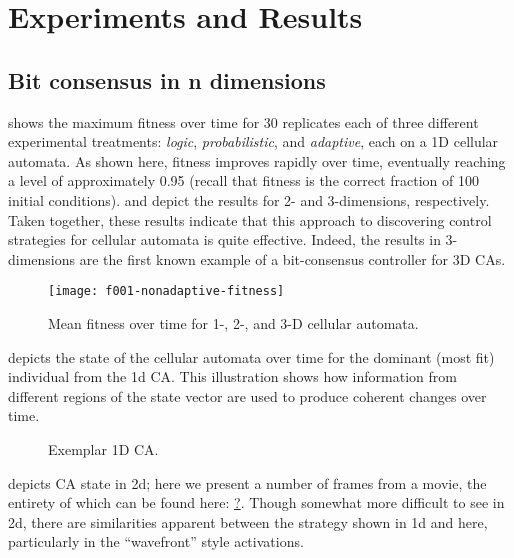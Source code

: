 \section{Experiments and Results}\label{s:results}


\subsection{Bit consensus in n dimensions}

 shows the maximum fitness over time for 30 replicates each of three different experimental treatments: {\em logic}, {\em probabilistic}, and {\em adaptive}, each on a 1D cellular automata.  As shown here, fitness improves rapidly over time, eventually reaching a level of approximately 0.95 (recall that fitness is the correct fraction of 100 initial conditions).   and  depict the results for 2- and 3-dimensions, respectively.  Taken together, these results indicate that this approach to discovering control strategies for cellular automata is quite effective.  Indeed, the results in 3-dimensions are the first known example of a bit-consensus controller for 3D CAs.

\begin{figure}
\centering\texttt{[image: f001-nonadaptive-fitness]}
\caption{Mean fitness over time for 1-, 2-, and 3-D cellular automata.}
\label{f:002-fitness}
\end{figure}

 depicts the state of the cellular automata over time for the dominant (most fit) individual from the 1d CA.  This illustration shows how information from different regions of the state vector are used to produce coherent changes over time.

\begin{figure}
\vspace{10em}
\caption{Exemplar 1D CA.}
\label{f:002-detail}
\end{figure}

 depicts CA state in 2d; here we present a number of frames from a movie, the entirety of which can be found here: \url{?}.  Though somewhat more difficult to see in 2d, there are similarities apparent between the strategy shown in 1d and here, particularly in the ``wavefront'' style activations.

